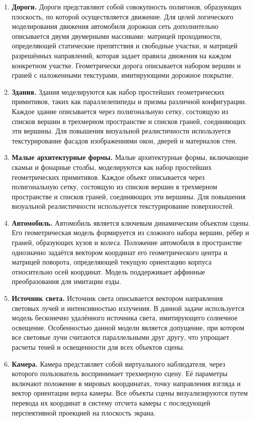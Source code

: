 \begin{enumerate}
	\item \textbf{Дороги.} Дороги представляют собой совокупность полигонов, образующих плоскость, по которой осуществляется движение. Для целей логического моделирования движения автомобиля дорожная сеть дополнительно описывается двумя двумерными массивами: матрицей проходимости, определяющей статические препятствия и свободные участки, и матрицей разрешённых направлений, которая задает правила движения на каждом конкретном участке. Геометрически дорога описывается набором вершин и граней с наложенными текстурами, имитирующими дорожное покрытие.
	
	\item \textbf{Здания.} Здания моделируются как набор простейших геометрических примитивов, таких как параллелепипеды и призмы различной конфигурации. Каждое здание описывается через полигональную сетку, состоящую из списков вершин в трехмерном пространстве и списков граней, соединяющих эти вершины. Для повышения визуальной реалистичности используется текстурирование фасадов изображениями окон, дверей и материалов стен.
	
	\item \textbf{Малые архитектурные формы.} Малые архитектурные формы, включающие скамьи и фонарные столбы, моделируются как набор простейших геометрических примитивов. Каждое объект описывается через полигональную сетку, состоящую из списков вершин в трехмерном пространстве и списков граней, соединяющих эти вершины. Для повышения визуальной реалистичности используется текстурирование поверхностей.
	
	\item \textbf{Автомобиль.} Автомобиль является ключевым динамическим объектом сцены. Его геометрическая модель формируется из сложного набора вершин, рёбер и граней, образующих кузов и колеса. Положение автомобиля в пространстве однозначно задаётся вектором координат его геометрического центра и матрицей поворота, определяющей текущую ориентацию корпуса относительно осей координат. Модель поддерживает аффинные преобразования для имитации езды.
	
	\item \textbf{Источник света.} Источник света описывается вектором направления световых лучей и интенсивностью излучения. В данной задаче используется модель бесконечно удалённого источника света, имитирующего солнечное освещение. Особенностью данной модели является допущение, при котором все световые лучи считаются параллельными друг другу, что упрощает расчеты теней и освещенности для всех объектов сцены.
	
	\item \textbf{Камера.} Камера представляет собой виртуального наблюдателя, через которого пользователь воспринимает трехмерную сцену. Её параметры включают положение в мировых координатах, точку направления взгляда и вектор ориентации верха камеры. Все объекты сцены визуализируются путем перевода их координат в систему отсчета камеры с последующей перспективной проекцией на плоскость экрана.
\end{enumerate}

